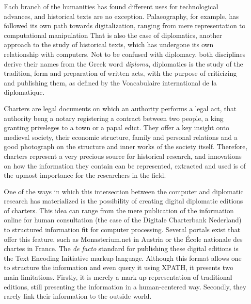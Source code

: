 \documentclass{article}
\begin{document}
Each branch of the humanities has found different uses for technological advances\cite{dalbello2011genealogy}, and historical texts are no exception.
Palaeography, for example, has followed its own path towards digitalization,  ranging from mere representation to computational manipulation\cite{ciula_digital_2017}
That is also the case of diplomatics, another approach to the study of historical texts, which has undergone its own relationship with computers\cite{calleja2023ordenador}\cite{ambrosio:hal-02305765}.
Not to be confused with diplomacy, both disciplines derive their names from the Greek word \emph{diploma}, diplomatics is the study of the tradition, form and preparation of written acts, with the purpose of criticizing and publishing them, as defined by the Voacabulaire international de la diplomatique\cite{carcel_orti_vocabulaire_1997}.

Charters are legal documents on which an authority performs a legal act, that authority beng a notary registering a contract between two people, a king granting priveleges to a town or a papal edict.
They offer a key insight onto medieval society, their economic structure, family and personal relations and a good photograph on the structure and inner works of the society itself.
Therefore, charters represent a very precious source for historical research, and innovations on how the information they contain can be represented, extracted and used is of the upmost importance for the researchers in the field.

One of the ways in which this intersection between the computer and diplomatic research has materialized is the possibility of creating digital diplomatic editions of charters.
This idea can range from the mere publication of the information online for human consultation (the case of the Digitale Charterbank Nederland\cite{burgers_digitale_2025}) to structured information fit for computer processing.
Several portals exist that offer this feature, such as Monasterium.net in Austria or the École nationale des chartes in France.
The \emph{de facto} standard for publishing these digital editions is the Text Encoding Initiative markup language\cite{tei_guidelines}.
 Although this format allows one to structure the information and even query it using XPATH, it presents two main limitations.
Firstly, it is merely a mark up representation of traditional editions, still presenting the information in a human-centered way. Secondly, they rarely link their information to the outside world.
\end{document}
